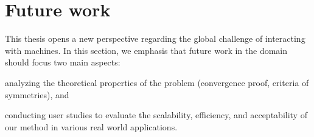 

\section{Future work}

This thesis opens a new perspective regarding the global challenge of interacting with machines. In this section, we emphasis that future work in the domain should focus two main aspects:  \begin{inparaenum}[(a)] \item analyzing the theoretical properties of the problem (convergence proof, criteria of symmetries), and \item  conducting user studies to evaluate the scalability, efficiency, and acceptability of our method in various real world applications. \end{inparaenum}


